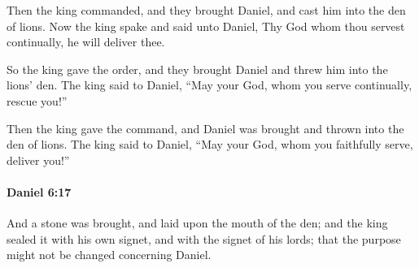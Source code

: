 			\begin{versebox}
					\item[BHS] 
					\item[LXX] 
					\item[ASV] Then the king commanded, and they brought Daniel, and cast him into the den of lions. Now the king spake and said unto Daniel, Thy God whom thou servest continually, he will deliver thee.
					\item[NIV] So the king gave the order, and they brought Daniel and threw him into the lions’ den. The king said to Daniel, “May your God, whom you serve continually, rescue you!”
					\item[NRSV] Then the king gave the command, and Daniel was brought and thrown into the den of lions. The king said to Daniel, “May your God, whom you faithfully serve, deliver you!”
			\end{versebox}

		\paragraph{Daniel 6:17} %
			\label{DANIEL-6-17}

			And a stone was brought, and laid upon the mouth of the den; and the king sealed it with his own signet, and with the signet of his lords; that the purpose might not be changed concerning Daniel.

